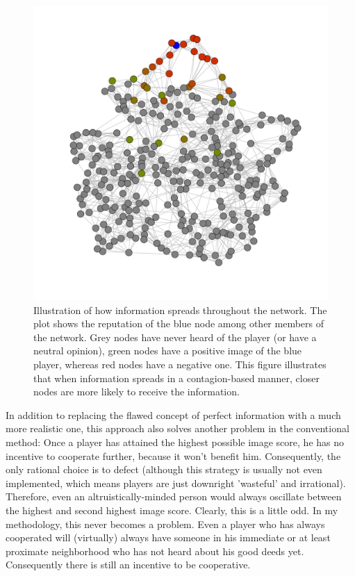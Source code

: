 \documentclass{JASSS}
\begin{document}
\begin{figure}
	\centering
	\includegraphics[width=0.7\linewidth]{./figures/illustration_Contagion.pdf}
	\caption{Illustration of how information spreads throughout the network. The plot shows the reputation of the blue node among other members of the network. Grey nodes have never heard of the player (or have a neutral opinion), green nodes have a positive image of the blue player, whereas red nodes have a negative one. This figure illustrates that when information spreads in a contagion-based manner, closer nodes are more likely to receive the information.}
	\label{illustrate_Contagion}
\end{figure}

In addition to replacing the flawed concept of perfect information with a much more realistic one, this approach also solves another problem in the conventional method: Once a player has attained the highest possible image score, he has no incentive to cooperate further, because it won't benefit him. Consequently, the only rational choice is to defect (although this strategy is usually not even implemented, which means players are just downright 'wasteful' and irrational). Therefore, even an altruistically-minded person would always oscillate between the highest and second highest image score. Clearly, this is a little odd. In my methodology, this never becomes a problem. Even a player who has always cooperated will (virtually) always have someone in his immediate or at least proximate neighborhood who has not heard about his good deeds yet. Consequently there is still an incentive to be cooperative.
\end{document}
